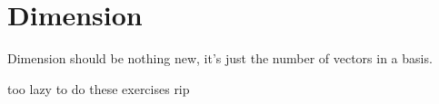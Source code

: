 \section{Dimension}

Dimension should be nothing new, it's just the number of vectors in a basis.

too lazy to do these exercises rip